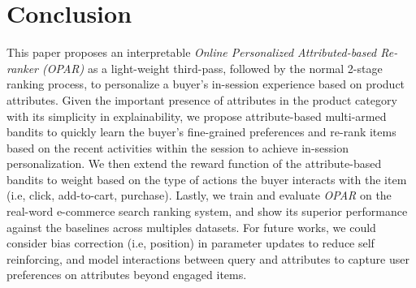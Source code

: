 \documentclass[11pt, dvipdfmx]{article}
\begin{document}
\section{Conclusion}\label{sec:conclusion}
This paper proposes an interpretable \textit{Online Personalized Attributed-based Re-ranker (OPAR)} as a light-weight third-pass, followed by the normal 2-stage ranking process, to personalize a buyer's in-session experience based on product attributes. Given the important presence of attributes in the product category with its simplicity in explainability, we propose attribute-based multi-armed bandits to quickly learn the buyer's fine-grained preferences and re-rank items based on the recent activities within the session to achieve in-session personalization. We then extend the reward function of the attribute-based bandits to weight based on the type of actions the buyer interacts with the item (i.e, click, add-to-cart, purchase). Lastly, we train and evaluate \textit{OPAR} on the real-word e-commerce search ranking system, and show its superior performance against the baselines across multiples datasets. 
For future works, we could consider bias correction (i.e, position) in parameter updates to reduce self reinforcing, and model interactions between query and attributes to capture user preferences on attributes beyond engaged items. 
\end{document}
